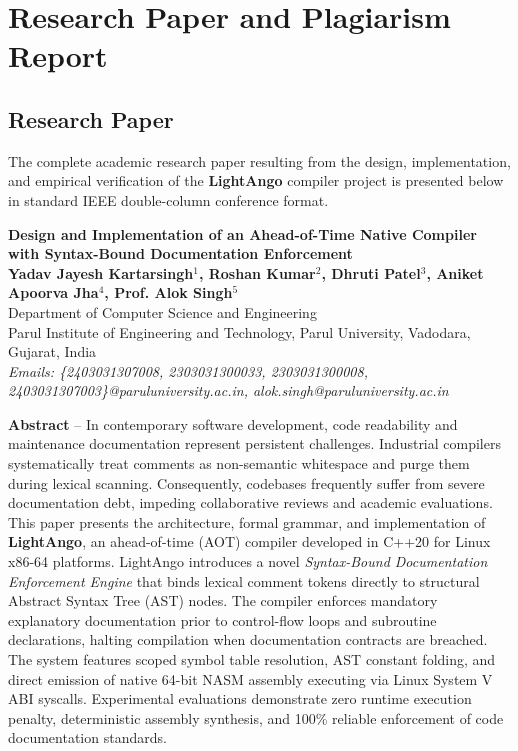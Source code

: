 \chapter{Research Paper and Plagiarism Report}\doublespacing

\section{Research Paper}
The complete academic research paper resulting from the design, implementation, and empirical verification of the \textbf{LightAngo} compiler project is presented below in standard IEEE double-column conference format.

\vspace{0.5cm}
\begin{center}
{\Large \textbf{Design and Implementation of an Ahead-of-Time Native Compiler with Syntax-Bound Documentation Enforcement}} \\
\vspace{0.3cm}
{\large \textbf{Yadav Jayesh Kartarsingh$^1$, Roshan Kumar$^2$, Dhruti Patel$^3$, Aniket Apoorva Jha$^4$, Prof. Alok Singh$^5$}} \\
\vspace{0.2cm}
{\normalsize Department of Computer Science and Engineering \\
Parul Institute of Engineering and Technology, Parul University, Vadodara, Gujarat, India \\
\textit{Emails: \{2403031307008, 2303031300033, 2303031300008, 2403031307003\}@paruluniversity.ac.in, alok.singh@paruluniversity.ac.in}}
\end{center}

\vspace{0.4cm}
\noindent
\textbf{Abstract} -- In contemporary software development, code readability and maintenance documentation represent persistent challenges. Industrial compilers systematically treat comments as non-semantic whitespace and purge them during lexical scanning. Consequently, codebases frequently suffer from severe documentation debt, impeding collaborative reviews and academic evaluations. This paper presents the architecture, formal grammar, and implementation of \textbf{LightAngo}, an ahead-of-time (AOT) compiler developed in C++20 for Linux x86-64 platforms. LightAngo introduces a novel \textit{Syntax-Bound Documentation Enforcement Engine} that binds lexical comment tokens directly to structural Abstract Syntax Tree (AST) nodes. The compiler enforces mandatory explanatory documentation prior to control-flow loops and subroutine declarations, halting compilation when documentation contracts are breached. The system features scoped symbol table resolution, AST constant folding, and direct emission of native 64-bit NASM assembly executing via Linux System V ABI syscalls. Experimental evaluations demonstrate zero runtime execution penalty, deterministic assembly synthesis, and 100\% reliable enforcement of code documentation standards.

